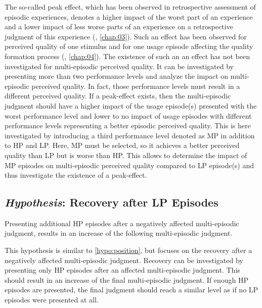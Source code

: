 The so-called peak effect, which has been observed in retrospective assessment of episodic experiences, denotes a higher impact of the worst part of an experience and a lower impact of less worse parts of an experience on a retrospective judgment of this experience (\cf, \autoref{chap:03}).
Such an effect has been observed for perceived quality of one stimulus and for one usage episode affecting the quality formation process (\cf, \autoref{chap:04}).
The existence of such an an effect has not been investigated for multi-episodic perceived quality.
It can be investigated by presenting more than two performance levels and analyze the impact on multi-episodic perceived quality.
In fact, those performance levels must result in a different perceived quality.
If a peak-effect exists, then the multi-episodic judgment should have a higher impact of the usage episode(s) presented with the worst performance level and lower to no impact of usage episodes with different performance levels representing a better episodic perceived quality.
This is here investigated by introducing a third performance level denoted as \ac{MP} in addition to \ac{HP} and \ac{LP}.
Here, \ac{MP} must be selected, so it achieves a better perceived quality than \ac{LP} but is worse than \ac{HP}.
This allows to determine the impact of \ac{MP} episodes on multi-episodic perceived quality compared to \ac{LP} episode(s) and thus investigate the existence of a peak-effect.



\subsection[H5: Recovery after \acs{LP} Episodes]{\emph{Hypothesis}: Recovery after \acs{LP} Episodes}
\begin{hypothesis}\label{hypo:recovery}
Presenting additional \ac{HP} episodes after a negatively affected multi-episodic judgment, results in an increase of the following multi-episodic judgment.
\end{hypothesis}

This hypothesis is similar to \autoref{hypo:position}, but focuses on the recovery after a negatively affected multi-episodic judgment.
Recovery can be investigated by presenting only \ac{HP} episodes after an affected multi-episodic judgment.
This should result in an increase of the final multi-episodic judgment.
If enough \ac{HP} episodes are presented, the final judgment should reach a similar level as if no \ac{LP} episodes were presented at all.

